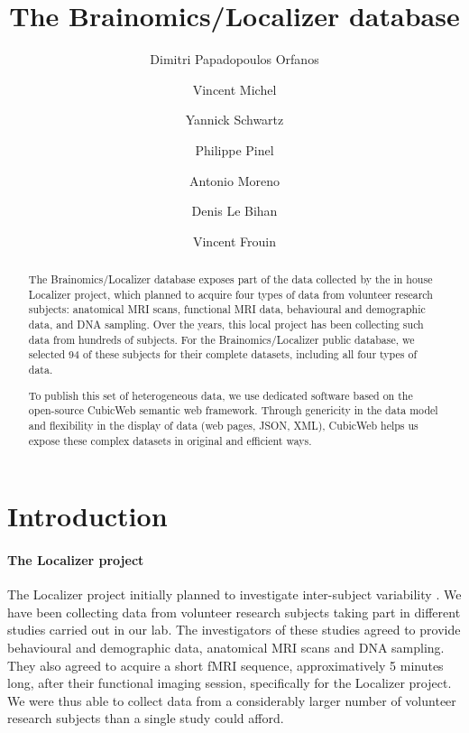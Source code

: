 \documentclass[review]{elsarticle}
\begin{document}
\begin{frontmatter}

\title{The Brainomics/Localizer database}

\author[Neurospin]{Dimitri Papadopoulos Orfanos}
\author[Logilab]{Vincent Michel}
\author[Parietal,Neurospin]{Yannick Schwartz}
\author[U992,Neurospin,ParisSud]{Philippe Pinel}
\author[U992,Neurospin,ParisSud]{Antonio Moreno}
\author[Neurospin]{Denis Le Bihan}
\author[Neurospin]{Vincent Frouin}

\address[Neurospin]{CEA, DSV/I2BM, NeuroSpin, 91191 Gif-sur-Yvette, France}
\address[U992]{INSERM, U992, Cognitive Neuroimaging Unit, 91191 Gif-sur-Yvette, France}
\address[Parietal]{Parietal team, Inria Saclay \^Ile-de-France, 91120 Palaiseau, France}
\address[ParisSud]{Univ. Paris-Sud, Cognitive Neuroimaging Unit, 91191 Gif-sur-Yvette, France}
\address[Logilab]{Logilab, 104 boulevard Auguste Blanqui, 75013 Paris, France}

\begin{abstract}
The Brainomics/Localizer database exposes part of the data collected by the in house Localizer project, which planned to acquire four types of data from volunteer research subjects: anatomical MRI scans, functional MRI data, behavioural and demographic data, and DNA sampling. Over the years, this local project has been collecting such data from hundreds of subjects. For the Brainomics/Localizer public database, we selected 94 of these subjects for their complete datasets, including all four types of data.

To publish this set of heterogeneous data, we use dedicated software based on the open-source CubicWeb semantic web framework. Through genericity in the data model and flexibility in the display of data (web pages, JSON, XML), CubicWeb helps us expose these complex datasets in original and efficient ways.
\end{abstract}

\end{frontmatter}


\section{Introduction}

\paragraph{The Localizer project} The Localizer project initially planned to investigate inter-subject variability \cite{Pinel2007}. We have been collecting data from volunteer research subjects taking part in different studies carried out in our lab. The investigators of these studies agreed to provide behavioural and demographic data, anatomical MRI scans and DNA sampling. They also agreed to acquire a short fMRI sequence, approximatively 5 minutes long, after their functional imaging session, specifically for the Localizer project. We were thus able to collect data from a considerably larger number of volunteer research subjects than a single study could afford.
\end{document}
